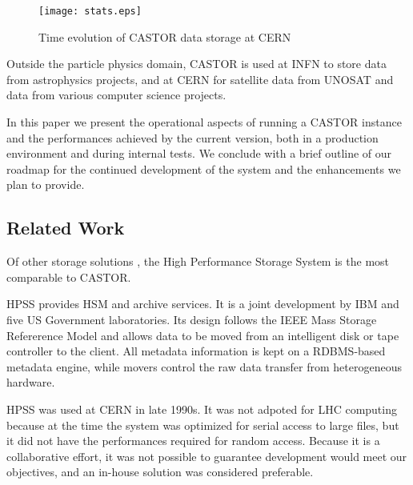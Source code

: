 \begin{figure}[htbp]
\centering
\texttt{[image: stats.eps]}
\caption{Time evolution of CASTOR data storage at CERN}
\label{fig:timeevol}
\end{figure}

Outside the particle physics domain, CASTOR is used at INFN to store
data from astrophysics projects, and at CERN for satellite data from
UNOSAT and data from various computer science projects.

In this paper we present the operational aspects of
running a CASTOR instance and the performances
achieved by the current version, both in a production environment and
during internal tests. We conclude with a brief outline of our roadmap
for the continued development of the system and the enhancements we plan
to provide.


\subsection{Related Work}

Of other storage solutions \cite{EDGStorage}, the High Performance Storage System
\cite{HPSS} is the most comparable to CASTOR.

HPSS provides HSM and archive services. It is a joint development by IBM and five US Government
laboratories. Its design follows the IEEE Mass Storage Refererence Model and
allows data to be moved from an intelligent disk or tape controller to the client.
All metadata information is kept on a RDBMS-based metadata engine, while movers
control the raw data transfer from heterogeneous hardware.

HPSS was used at CERN in late 1990s. It was not adpoted for LHC
computing because at the time the system was optimized for serial access
to large files, but it did not have the performances required for random access.
Because it is a collaborative effort, it was not possible to guarantee
development would meet our objectives, and an in-house solution was considered preferable.
